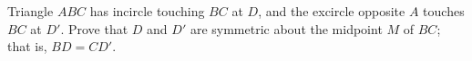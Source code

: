 Triangle $ABC$ has incircle touching $BC$ at $D$, and the excircle opposite $A$ touches $BC$ at $D'$. Prove that $D$ and $D'$ are symmetric about the midpoint $M$ of $BC$; that is, $BD=CD'$.
